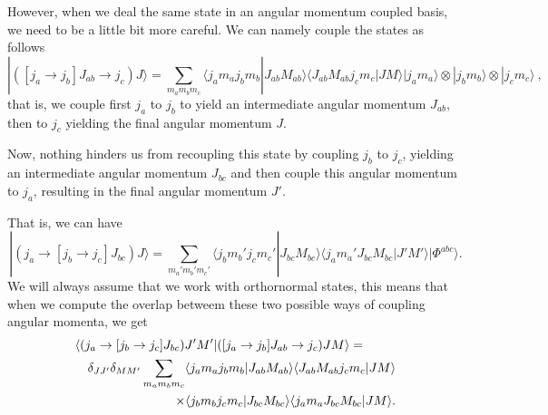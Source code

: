 \documentclass[graybox,sectrefs,envcountresetchap,open=right]{svmonodo}
\begin{document}
However, when we deal the same state in an angular momentum coupled basis, we need to be a little bit more careful. We can namely couple the states
as follows
\[
| ([j_a\rightarrow j_b]J_{ab}\rightarrow j_c) J\rangle= \sum_{m_am_bm_c}\langle j_am_aj_bm_b|J_{ab}M_{ab}\rangle \langle J_{ab}M_{ab}j_cm_c|JM\rangle|j_am_a\rangle\otimes |j_bm_b\rangle \otimes |j_cm_c\rangle \ , 
\label{eq:fabc}
\]
that is, we couple first $j_a$ to $j_b$ to yield an intermediate angular momentum $J_{ab}$, then to $j_c$ yielding the final angular momentum $J$.



Now, nothing hinders us from recoupling this state by coupling $j_b$ to $j_c$, yielding an intermediate angular momentum $J_{bc}$ and then couple this angular momentum to $j_a$, resulting in the final angular momentum $J'$. 

That is, we can have 
\[
| (j_a\rightarrow [j_b\rightarrow j_c]J_{bc}) J\rangle = \sum_{m_a'm_b'm_c'}\langle j_bm_b'j_cm_c'|J_{bc}M_{bc}\rangle \langle j_am_a'J_{bc}M_{bc}|J'M'\rangle|\Phi^{abc}\rangle .
\]
We will always assume that we work with orthornormal states, this means that when we compute the overlap betweem these two possible ways of coupling angular momenta, we get 
\begin{eqnarray}
\nonumber
\lefteqn{ \langle (j_a\rightarrow [j_b\rightarrow j_c]J_{bc}) J'M'| ([j_a\rightarrow j_b]J_{ab}\rightarrow j_c) JM\rangle = } \\
\nonumber
& & \delta_{JJ'}\delta_{MM'}\sum_{m_am_bm_c}\langle j_am_aj_bm_b|J_{ab}M_{ab}\rangle \langle J_{ab}M_{ab}j_cm_c|JM\rangle \\
& & \times \langle j_bm_bj_cm_c|J_{bc}M_{bc}\rangle \langle j_am_aJ_{bc}M_{bc}|JM\rangle . \nonumber
\end{eqnarray}
\end{document}
